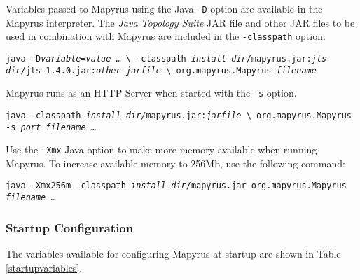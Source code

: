 Variables passed to Mapyrus using the Java \texttt{-D} option
are available in the Mapyrus interpreter.  The
\textit{Java Topology Suite} JAR file and other JAR files
to be used in combination with Mapyrus are included in the
\texttt{-classpath} option.

\begin{alltt}
\texttt{java -D\textit{variable}=\textit{value} \dots\ \textbackslash
  -classpath \textit{install-dir}/mapyrus.jar:\textit{jts-dir}/jts-1.4.0.jar:\textit{other-jarfile} \textbackslash
  org.mapyrus.Mapyrus \textit{filename}}
\end{alltt}

Mapyrus runs as an HTTP Server when started with the
\texttt{-s} option.

\begin{alltt}
\texttt{java -classpath \textit{install-dir}/mapyrus.jar:\textit{jarfile} \textbackslash
  org.mapyrus.Mapyrus -s \textit{port} \textit{filename} \dots}
\end{alltt}

\label{morememory}
Use the
\texttt{-Xmx} Java option
to make more memory available when running Mapyrus.
To increase available memory to 256Mb, use the following command:

\begin{alltt}
\texttt{java -Xmx256m -classpath \textit{install-dir}/mapyrus.jar org.mapyrus.Mapyrus \textit{filename} \dots}
\end{alltt}

\subsubsection{Startup Configuration}

The variables available for configuring Mapyrus at startup are
shown in Table \ref{startupvariables}.

